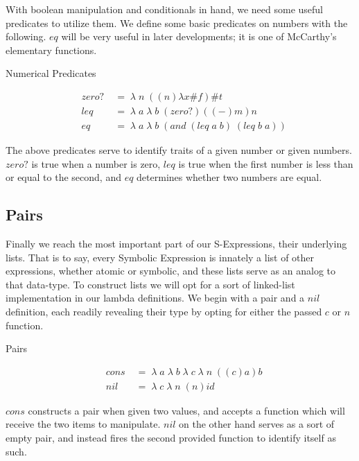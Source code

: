 With boolean manipulation and conditionals in hand, we need some useful predicates 
to utilize them. We define some basic predicates on numbers with the following. 
$eq$ will be very useful in later developments; it is one of McCarthy's elementary 
functions.

Numerical Predicates
\begin{figure}[htp]
\caption{}\label{scheme}
\begin{align*}
& zero? \; &= \; \lambda \; n \; ((n)λx\#f)\#t
\\& leq \; &= \; \lambda \; a \; \lambda \; b \; (zero?)((-)m)n
\\& eq \; &= \; \lambda \; a \; \lambda \; b \; (and \; (leq \; a \; b) \; (leq \; b \; a))
\end{align*}
\end{figure}

The above predicates serve to identify traits of a given number or given numbers. 
$zero?$ is true when a number is zero, $leq$ is true when the first number is less 
than or equal to the second, and $eq$ determines whether two numbers are equal.

\subsection{Pairs}
Finally we reach the most important part of our S-Expressions, their underlying 
lists. That is to say, every Symbolic Expression is innately a list of other 
expressions, whether atomic or symbolic, and these lists serve as an analog to 
that data-type. To construct lists we will opt for a sort of linked-list 
implementation in our lambda definitions. We begin with a pair and a $nil$ 
definition, each readily revealing their type by opting for either the passed $c$ 
or $n$ function.

Pairs
\begin{figure}[htp]
\caption{}\label{scheme}
\begin{align*}
& cons \; &= \; \lambda \; a \; \lambda \; b \; \lambda \; c \; \lambda \; n \; ((c)a)b
\\& nil \; &= \; \lambda \; c \; \lambda \; n \; (n)id
\end{align*}
\end{figure}

$cons$ constructs a pair when given two values, and accepts a function which will 
receive the two items to manipulate. $nil$ on the other hand serves as a sort of 
empty pair, and instead fires the second provided function to identify itself as 
such.

